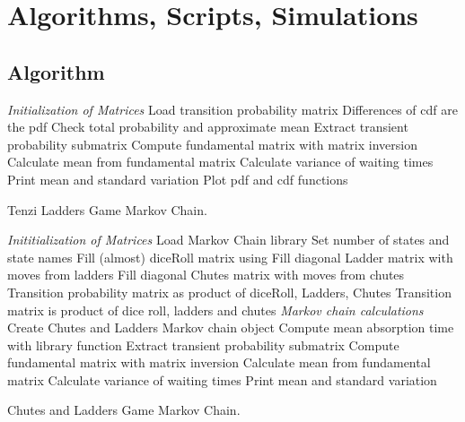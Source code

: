 \documentclass[12pt]{article}
\begin{document}
\section*{Algorithms, Scripts, Simulations}

\subsection*{Algorithm}
\begin{algorithm}[H]
  \DontPrintSemicolon
  \BlankLine
  \emph{Initialization of Matrices}\;
  Load transition probability matrix\;
  Differences of cdf are the pdf\;
  Check total probability and approximate mean\;
  \BlankLine
  Extract transient probability submatrix\;
  Compute fundamental matrix with matrix inversion\;
  Calculate mean from fundamental matrix\;
  Calculate variance of waiting times\;
  Print mean and standard variation\;
  Plot pdf and cdf functions\;
  \caption{Tenzi Ladders Game Markov Chain.}
\end{algorithm}

\begin{algorithm}[H]
  \DontPrintSemicolon
  \BlankLine
  

  \BlankLine
    
  \emph{Inititialization of Matrices}\;
  Load Markov Chain library\;
  Set number of states and state names\;
  Fill (almost) diceRoll matrix using \Frotvec\;
  Fill diagonal Ladder matrix with moves from ladders\;
  Fill diagonal Chutes matrix with moves from chutes\;
  Transition probability matrix as product of diceRoll, Ladders, Chutes
  Transition matrix is product of dice roll, ladders and chutes\;
  \emph{Markov chain calculations}\;
  Create Chutes and Ladders Markov chain object\;
  Compute mean absorption time with library function\;
  Extract transient probability submatrix\;
  Compute fundamental matrix with matrix inversion\;
  Calculate mean from fundamental matrix\;
  Calculate variance of waiting times\;
  Print mean and standard variation\;
  \caption{Chutes and Ladders Game Markov Chain.}
\end{algorithm}
\end{document}
